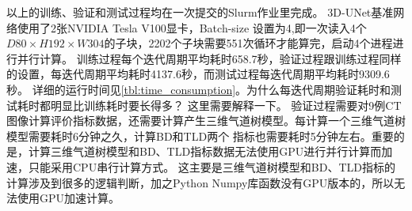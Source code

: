 以上的训练、验证和测试过程均在一次提交的Slurm作业里完成。 3D-UNet基准网络使用了2张NVIDIA Tesla V100显卡，Batch-size
设置为4,即一次读入4个$D80 \times H192 \times W304$的子块，2202个子块需要551次循环才能算完，启动4个进程进行并行计算。
训练过程每个迭代周期平均耗时658.7秒，验证过程跟训练过程同样的设置，每迭代周期平均耗时4137.6秒，而测试过程每迭代周期平均耗时9309.6秒。
详细的运行时间见\autoref{tbl:time_consumption}。为什么每迭代周期验证耗时和测试耗时都明显比训练耗时要长得多？ 这里需要解释一下。
验证过程需要对9例CT图像计算评价指标数据，还需要计算产生三维气道树模型。每计算一个三维气道树模型需要耗时6分钟之久，计算BD和TLD两个
指标也需要耗时5分钟左右。重要的是，计算三维气道树模型和BD、TLD指标数据无法使用GPU进行并行计算而加速，只能采用CPU串行计算方式。
这主要是三维气道树模型和BD、TLD指标的计算涉及到很多的逻辑判断，加之Python Numpy库函数没有GPU版本的，所以无法使用GPU加速计算。
